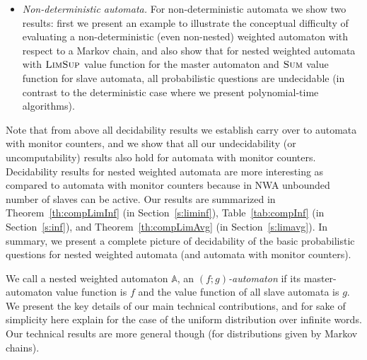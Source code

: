 \documentclass{lmcs}
\newcommand{\nestedA}{\mathbb{A}}
\newcommand{\fsum}{\textsc{Sum}}
\newcommand{\flimsup}{\textsc{LimSup}}
\begin{document}
\begin{itemize}
\item {\em Non-deterministic automata.}
For non-deterministic automata we show two results: first we present an
example to illustrate the conceptual difficulty of evaluating a non-deterministic
(even non-nested) weighted automaton with respect to a Markov chain, and also show that
for nested weighted automata with $\flimsup$ value function for
the master automaton and $\fsum$ value function for slave automata,
all probabilistic questions are undecidable (in contrast to the
deterministic case where we present polynomial-time algorithms).
\end{itemize}

\noindent
Note that from above all decidability results we establish carry over to
automata with monitor counters, and we show that all our undecidability
(or uncomputability) results also hold for automata with monitor counters.
Decidability results for nested weighted automata are more interesting as
compared to automata with monitor counters because in NWA unbounded number of slaves can be active.
Our results are summarized in Theorem~\ref{th:compLimInf} (in Section~\ref{s:liminf}),
Table~\ref{tab:compInf} (in Section~\ref{s:inf}), and Theorem~\ref{th:compLimAvg} (in Section~\ref{s:limavg}).
In summary, we present a complete picture of decidability of the basic
probabilistic questions for nested weighted automata (and automata with
monitor counters).



\smallskip{}
We call a nested weighted automaton $\nestedA$, an \emph{$(f;g)$-automaton} if its master-automaton
value function is $f$ and the value function of all slave automata is $g$.
We present the key details of our main technical contributions, and for sake of simplicity here explain for the case of
the uniform distribution over infinite words.
Our technical results are more general though (for distributions given by Markov chains).
\end{document}
